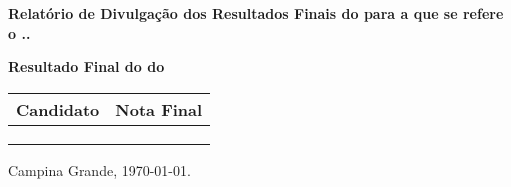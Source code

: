 \documentclass[12pt]{uaefata}
\date{} %
\begin{document}
\begin{letter}{
		\textbf{Relatório de Divulgação dos Resultados Finais do \concurso para \cargo  a que se refere o \edital..}
	}
 
\opening{}


\centering


\textbf{Resultado Final do \concurso do \edital}

\begin{tabular}{|l|c|}
	\hline
	\textbf{Candidato}	&	\textbf{Nota Final}	\\
	\hline
	\cdta	&	\cdtanf  	\\
	\cdtb	&	\cdtbnf 	\\
	\cdtc	& 	\cdtcnf 	\\
	\hline
\end{tabular}

\closing{Campina Grande, \today.}



\end{letter}
\end{document}
